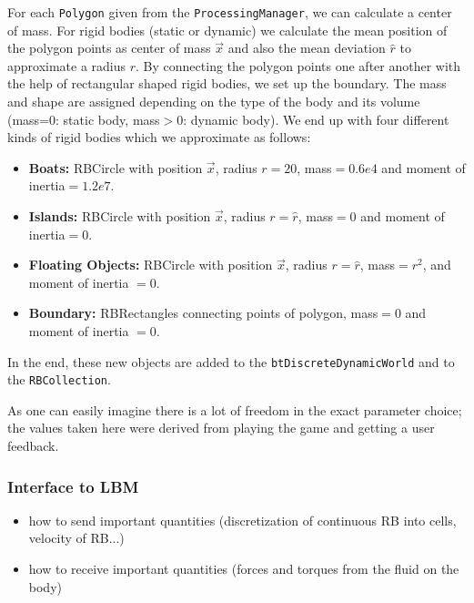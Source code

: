 For each \texttt{Polygon} given from the \texttt{ProcessingManager}, we can calculate a center of mass. For rigid bodies (static or dynamic) we calculate the mean position of the polygon points as center of mass $\vec{x}$ and also the mean deviation $\hat{r}$ to approximate a radius $r$. By connecting the polygon points one after another with the help of rectangular shaped rigid bodies, we set up the boundary. The mass and shape are assigned depending on the type of the body and its volume (mass=0: static body, mass$>$0: dynamic body). We end up with four different kinds of rigid bodies which we approximate as follows:
\begin{itemize}
\item \textbf{Boats:} RBCircle with position $\vec{x}$, radius $r=20$, mass$=0.6e4$ and moment of inertia$=1.2e7$.
\item \textbf{Islands:} RBCircle with position $\vec{x}$, radius $r=\hat{r}$, mass$=0$ and moment of inertia$=0$.
\item \textbf{Floating Objects:} RBCircle with position $\vec{x}$, radius $r=\hat{r}$, mass$=r^2$, and moment of inertia $=0$.
\item \textbf{Boundary:} RBRectangles connecting points of polygon, mass$=0$ and moment of inertia $=0$.
\end{itemize}
In the end, these new objects are added to the \texttt{btDiscreteDynamicWorld} and to the \texttt{RBCollection}.


As one can easily imagine there is a lot of freedom in the exact parameter choice; the values taken here were derived from playing the game and getting a user feedback.
\subsubsection{Interface to LBM}

\begin{itemize}
\item how to send important quantities (discretization of continuous RB into cells, velocity of RB...)
\item how to receive important quantities (forces and torques from the fluid on the body)
\end{itemize}

